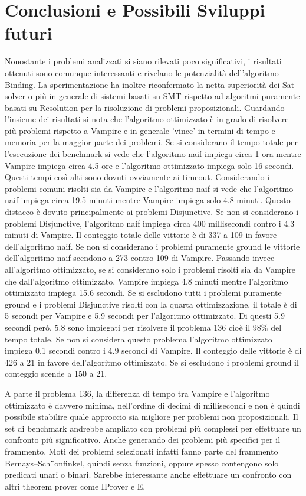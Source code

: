 \documentclass[./main.tex]{subfiles}
\begin{document}
\section{Conclusioni e Possibili Sviluppi futuri}
Nonostante i problemi analizzati si siano rilevati poco significativi, 
i risultati ottenuti sono comunque interessanti e rivelano le potenzialità dell'algoritmo Binding.
La sperimentazione ha inoltre riconfermato la netta superiorità dei Sat solver o più in generale di sistemi 
basati su SMT rispetto ad algoritmi puramente basati su Resolution per la risoluzione di problemi proposizionali.
Guardando l'insieme dei risultati si nota che l'algoritmo ottimizzato è in grado di risolvere più problemi rispetto a Vampire 
e in generale 'vince' in termini di tempo e memoria per la maggior parte dei problemi.
Se si considerano il tempo totale per l'esecuzione dei benchmark si vede che l'algoritmo naif impiega circa 1 ora 
mentre Vampire impiega circa 4.5 ore e l'algoritmo ottimizzato impiega solo 16 secondi.
Questi tempi così alti sono dovuti ovviamente ai timeout.
Considerando i problemi comuni risolti sia da Vampire e l'algoritmo naif si vede che l'algoritmo naif impiega
circa 19.5 minuti mentre Vampire impiega solo 4.8 minuti. 
Questo distacco è dovuto principalmente ai problemi Disjunctive. 
Se non si considerano i problemi Disjunctive, l'algoritmo naif impiega circa 400 millisecondi contro i 4.3 minuti di Vampire.
Il conteggio totale delle vittorie è di 337 a 109 in favore dell'algoritmo naif.
Se non si considerano i problemi puramente ground le vittorie dell'algoritmo naif scendono a 273 contro 109 di Vampire.
Passando invece all'algoritmo ottimizzato, se si considerano solo i problemi risolti sia da Vampire che dall'algoritmo ottimizzato,
Vampire impiega 4.8 minuti mentre l'algoritmo ottimizzato impiega 15.6 secondi.
Se si escludono tutti i problemi puramente ground e i problemi Disjunctive risolti con la quarta ottimizzazione,
il totale è di 5 secondi per Vampire e 5.9 secondi per l'algoritmo ottimizzato.
Di questi 5.9 secondi però, 5.8 sono impiegati per risolvere il problema 136 cioè il $98\%$ del tempo totale.  
Se non si considera questo problema l'algoritmo ottimizzato impiega 0.1 secondi contro i 4.9 secondi di Vampire.
Il conteggio delle vittorie è di 426 a 21 in favore dell'algoritmo ottimizzato. 
Se si escludono i problemi ground il conteggio scende a 150 a 21.

A parte il problema 136, la differenza di tempo tra Vampire e l'algoritmo ottimizzato è davvero minima, nell'ordine di 
decimi di millisecondi e non è quindi possibile stabilire quale approccio sia migliore per problemi non proposizionali.
Il set di benchmark andrebbe ampliato con problemi più complessi per effettuare un confronto più significativo.
Anche generando dei problemi più specifici per il frammento.
Moti dei problemi selezionati infatti fanno parte del frammento Bernays–Sch¨onfinkel, quindi senza funzioni, oppure
spesso contengono solo predicati unari o binari.
Sarebbe interessante anche effettuare un confronto con altri theorem prover come IProver e E.
\end{document}
